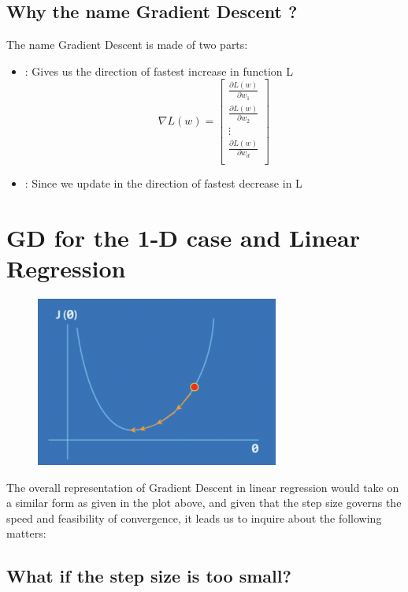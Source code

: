 \subsection{Why the name Gradient Descent ?}
The name Gradient Descent is made of two parts:
\begin{itemize}
  \item {} :  Gives us the direction of fastest increase in function L
        \begin{equation*}
          \nabla L(w) =
          \begin{bmatrix}
            \frac{\partial L(w)}{\partial w_{1}} \\
            \frac{\partial L(w)}{\partial w_{2}} \\
            \vdots                               \\
            \frac{\partial L(w)}{\partial w_{d}} \\
          \end{bmatrix}
        \end{equation*}
  \item {} : Since we update in the direction of fastest decrease in L
\end{itemize}
\section{GD for the 1-D case and Linear Regression}
\begin{figure}[h]
  \includegraphics[width=8cm]{images/10.png}
  \centering
\end{figure}

The overall representation of Gradient Descent in linear regression would take on a similar form as given in the plot above, and given that the step size governs the speed and feasibility of convergence, it leads us to inquire about the following matters:

\subsection{What if the step size is too small?}

